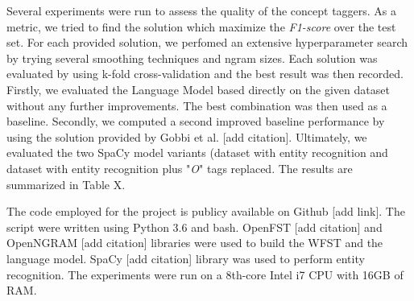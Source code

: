 \documentclass[11pt,a4paper]{article}
\begin{document}
Several experiments were run to assess the quality of 
the concept taggers. As a metric, we tried to find the solution which maximize the \textit{F1-score} over the test set. For each provided solution, we perfomed an extensive hyperparameter search by trying several smoothing techniques and ngram sizes. Each solution was evaluated by using k-fold cross-validation and the best result was then recorded. Firstly, we evaluated the Language Model based directly on the given dataset without any further improvements. The best combination was then used as a baseline. Secondly, we computed a second improved baseline performance by using the solution provided by Gobbi et al. [add citation]. Ultimately, we evaluated the two SpaCy model variants (dataset with entity recognition and dataset with entity recognition plus "\textit{O}" tags replaced. The results are summarized in Table X.

The code employed for the project is publicy available on Github [add link]. The script were written using Python 3.6 and bash. OpenFST [add citation] and OpenNGRAM [add citation] libraries were used to build the WFST and the language model. SpaCy [add citation] library was used to perform entity recognition.
The experiments were run on a 8th-core Intel i7 CPU with 16GB of RAM. 
\end{document}
